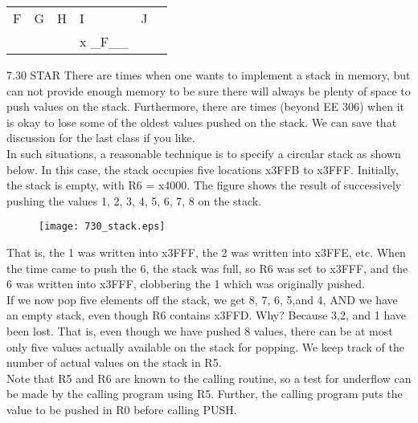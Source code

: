 \documentclass{patt}
\begin{document}
\begin{exercises}
\begin{table}[h!]
\begin{center}
\large
\begin{tabular}{|m{2cm}|m{2cm}|m{2cm}|m{2cm}|m{2cm}|m{1mm}}
\cline{1-5}
F     & G     & H     & I     & J     & \\[8pt] \cline{1-5}
      &       &       & { x \_F\_\_} &       & \\[8pt] \cline{1-5}
\end{tabular}
\end{center}
\end{table}

\item[7.30]STAR There are times when one wants to implement a stack
in memory, but can not provide enough memory to be sure there will
always be plenty of space to push values on the stack.  Furthermore,
there are times (beyond EE 306) when it is okay to lose some of the
oldest values pushed on the stack.  We can save that discussion for
the last class if you like. \\

\noindent In such situations, a reasonable technique is to specify a circular
stack as shown below.  In this case, the stack occupies five locations
x3FFB to x3FFF.  Initially, the stack is empty, with R6 = x4000.  The
figure shows the result of successively pushing the values
1, 2, 3, 4, 5, 6, 7, 8 on the stack.

\begin{figure}[h]
\centering
\texttt{[image: 730\_stack.eps]}
\end{figure}

\noindent That is, the 1 was written into x3FFF, the 2 was written into x3FFE, etc.
When the time came to push the 6, the stack was full, so R6 was set to
x3FFF, and the 6 was written into x3FFF, clobbering the 1 which was originally
pushed. \\

\noindent If we now pop five elements off the stack, we get 8, 7, 6, 5,and 4, AND we have
an empty stack, even though R6 contains x3FFD.  Why?  Because 3,2, and
1 have been lost.  That is, even though we have pushed 8 values, there
can be at most only five values actually available on the stack for
popping.  We keep track of the number of actual values on the stack in
R5. \\

\noindent Note that R5 and R6 are known to the calling routine, so a test for
underflow can be made by the calling program using R5.  Further, the calling
program puts the value to be pushed in R0 before calling PUSH. \\


\end{exercises}
\end{document}
